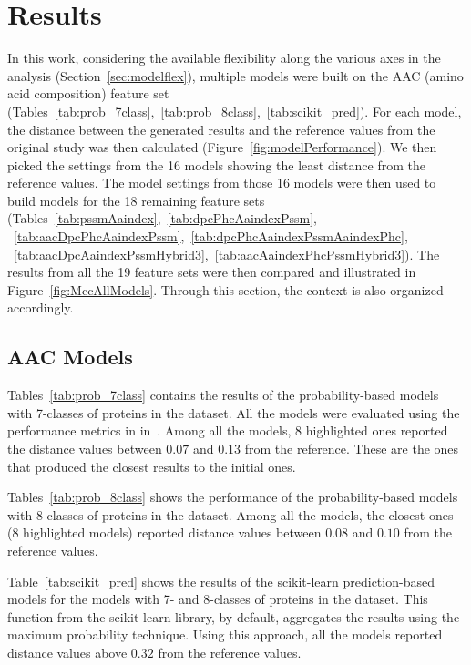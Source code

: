 \chapter{Results}
In this work, considering the available flexibility along the various axes in the analysis 
(Section~\ref{sec:modelflex}), multiple models were built on the AAC (amino acid composition) 
feature set (Tables~\ref{tab:prob_7class},~\ref{tab:prob_8class},~\ref{tab:scikit_pred}). 
For each model, the distance between the generated results and the reference values from 
the original study was then calculated (Figure~\ref{fig:modelPerformance}). We then picked 
the settings from the 16 models showing the least distance from the reference values. 
The model settings from those 16 models were then used to build models for the 18 
remaining feature sets (Tables~\ref{tab:pssmAaindex},~\ref{tab:dpcPhcAaindexPssm},
~\ref{tab:aacDpcPhcAaindexPssm},~\ref{tab:dpcPhcAaindexPssmAaindexPhc},
~\ref{tab:aacDpcAaindexPssmHybrid3},~\ref{tab:aacAaindexPhcPssmHybrid3}). 
The results from all the 19 feature sets were then compared and 
illustrated in Figure~\ref{fig:MccAllModels}. Through this section, the context is also 
organized accordingly.

\section{AAC Models}
Tables~\ref{tab:prob_7class} contains the results of the probability-based models with 
7-classes of proteins in the dataset. All the models were evaluated using the performance 
metrics in in~\cite{mishra_prediction_2014}. Among all the models, 8 highlighted ones reported 
the distance values between $0.07$ and $0.13$ from the reference. These are the ones that produced 
the closest results to the initial ones.

Tables~\ref{tab:prob_8class} shows the performance of the probability-based models with 
8-classes of proteins in the dataset. Among all the models, the closest ones (8 highlighted models) 
reported distance values between $0.08$ and $0.10$ from the reference values. 

Table~\ref{tab:scikit_pred} shows the results of the scikit-learn prediction-based models 
for the models with 7- and 8-classes of proteins in the dataset. This function from the 
scikit-learn library, by default, aggregates the results using the maximum probability 
technique. Using this approach, all the models reported distance values above $0.32$ 
from the reference values.


